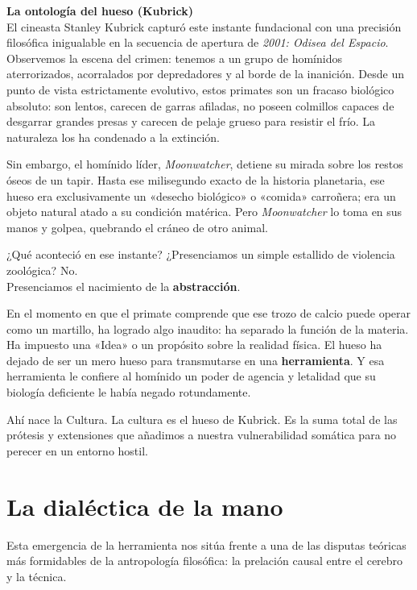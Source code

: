 \begin{ejemplo}
\textbf{La ontología del hueso (Kubrick)}\\
El cineasta Stanley Kubrick capturó este instante fundacional con una precisión filosófica inigualable en la secuencia de apertura de \textit{2001: Odisea del Espacio}. Observemos la escena del crimen: tenemos a un grupo de homínidos aterrorizados, acorralados por depredadores y al borde de la inanición. Desde un punto de vista estrictamente evolutivo, estos primates son un fracaso biológico absoluto: son lentos, carecen de garras afiladas, no poseen colmillos capaces de desgarrar grandes presas y carecen de pelaje grueso para resistir el frío. La naturaleza los ha condenado a la extinción.

Sin embargo, el homínido líder, \textit{Moonwatcher}, detiene su mirada sobre los restos óseos de un tapir. Hasta ese milisegundo exacto de la historia planetaria, ese hueso era exclusivamente un «desecho biológico» o «comida» carroñera; era un objeto natural atado a su condición matérica. Pero \textit{Moonwatcher} lo toma en sus manos y golpea, quebrando el cráneo de otro animal. 
\end{ejemplo}

¿Qué aconteció en ese instante? ¿Presenciamos un simple estallido de violencia zoológica? No.\\
Presenciamos el nacimiento de la \textbf{abstracción}. 

En el momento en que el primate comprende que ese trozo de calcio puede operar como un martillo, ha logrado algo inaudito: ha separado la función de la materia. Ha impuesto una «Idea» o un propósito sobre la realidad física. El hueso ha dejado de ser un mero hueso para transmutarse en una \textbf{herramienta}. Y esa herramienta le confiere al homínido un poder de agencia y letalidad que su biología deficiente le había negado rotundamente. 

Ahí nace la Cultura. La cultura es el hueso de Kubrick. Es la suma total de las prótesis y extensiones que añadimos a nuestra vulnerabilidad somática para no perecer en un entorno hostil.

\section{La dialéctica de la mano}

Esta emergencia de la herramienta nos sitúa frente a una de las disputas teóricas más formidables de la antropología filosófica: la prelación causal entre el cerebro y la técnica.

